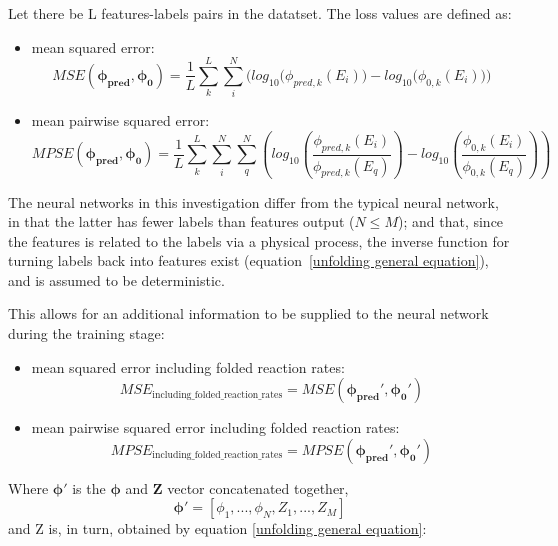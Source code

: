 \documentclass[a4paper, 12pt]{article}
\newcommand{\ve}[1]{\boldsymbol{#1}}
\begin{document}
    Let there be L features-labels pairs in the datatset. The loss values are defined as:
    \begin{itemize}
        \item mean squared error:
        \begin{equation}\label{MSE}
            MSE(\ve{\phi_{pred}},\ve{\phi_0}) = \frac{1}{L} \sum_{k}^L \sum_i^N \bigg( log_{10}\big(\phi_{pred,k}(E_i)\big)-log_{10}\big(\phi_{0,k}(E_i)\big) \bigg)
        \end{equation}
        \item mean pairwise squared error:
        \begin{equation}\label{MPSE}
            MPSE(\ve{\phi_{pred}}, \ve{\phi_{0}}) = \frac{1}{L} \sum_{k}^L \sum_i^N \sum_q^N \left( log_{10}\left(\frac{\phi_{pred,k}(E_i)}{\phi_{pred,k}(E_q)}\right)-log_{10}\left(\frac{\phi_{0,k}(E_i)}{\phi_{0,k}(E_q)}\right) \right)
        \end{equation}

    \end{itemize}
    The neural networks in this investigation differ from the typical neural network, in that the latter has fewer labels than features output ($N \le M$); and that, since the features is related to the labels via a physical process, the inverse function for turning labels back into features exist (equation~\ref{unfolding general equation}), and is assumed to be deterministic.
    
    This allows for an additional information to be supplied to the neural network during the training stage:
        
    \begin{itemize}
        \item mean squared error including folded reaction rates:
        \begin{equation}\label{MSE_including_folded_reaction_rates}
            MSE_{\text{including\_folded\_reaction\_rates}}=MSE(\ve{\phi_{pred}'},\ve{\phi_{0}'})
        \end{equation}
        \item mean pairwise squared error including folded reaction rates:
        \begin{equation}\label{MPSE_including_folded_reaction_rates}
            MPSE_{\text{including\_folded\_reaction\_rates}} = MPSE(\ve{\phi_{pred}'},\ve{\phi_{0}'})
        \end{equation}
    \end{itemize}
    Where $\ve{\phi'}$ is the $\ve{\phi}$ and $\ve{Z}$ vector concatenated together,
    \begin{equation}\label{NNregularization}
        \ve{\phi'} = [\phi_1, ..., \phi_N, Z_1, ..., Z_M]
    \end{equation}
    and Z is, in turn, obtained by equation \ref{unfolding general equation}:
\end{document}
